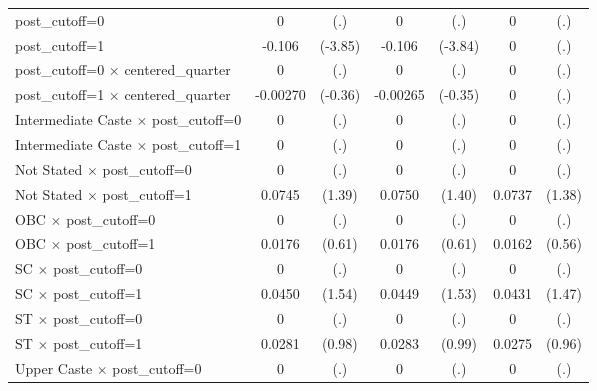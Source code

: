 {\begin{tabular}{l*{3}{cc}}
post\_cutoff=0       &           0         &         (.)&           0         &         (.)&           0         &         (.)\\
post\_cutoff=1       &      -0.106\sym{***}&     (-3.85)&      -0.106\sym{***}&     (-3.84)&           0         &         (.)\\
post\_cutoff=0 $\times$ centered\_quarter&           0         &         (.)&           0         &         (.)&           0         &         (.)\\
post\_cutoff=1 $\times$ centered\_quarter&    -0.00270         &     (-0.36)&    -0.00265         &     (-0.35)&           0         &         (.)\\
Intermediate Caste $\times$ post\_cutoff=0&           0         &         (.)&           0         &         (.)&           0         &         (.)\\
Intermediate Caste $\times$ post\_cutoff=1&           0         &         (.)&           0         &         (.)&           0         &         (.)\\
Not Stated $\times$ post\_cutoff=0&           0         &         (.)&           0         &         (.)&           0         &         (.)\\
Not Stated $\times$ post\_cutoff=1&      0.0745         &      (1.39)&      0.0750         &      (1.40)&      0.0737         &      (1.38)\\
OBC $\times$ post\_cutoff=0&           0         &         (.)&           0         &         (.)&           0         &         (.)\\
OBC $\times$ post\_cutoff=1&      0.0176         &      (0.61)&      0.0176         &      (0.61)&      0.0162         &      (0.56)\\
SC $\times$ post\_cutoff=0&           0         &         (.)&           0         &         (.)&           0         &         (.)\\
SC $\times$ post\_cutoff=1&      0.0450         &      (1.54)&      0.0449         &      (1.53)&      0.0431         &      (1.47)\\
ST $\times$ post\_cutoff=0&           0         &         (.)&           0         &         (.)&           0         &         (.)\\
ST $\times$ post\_cutoff=1&      0.0281         &      (0.98)&      0.0283         &      (0.99)&      0.0275         &      (0.96)\\
Upper Caste $\times$ post\_cutoff=0&           0         &         (.)&           0         &         (.)&           0         &         (.)\\

\end{tabular}}
